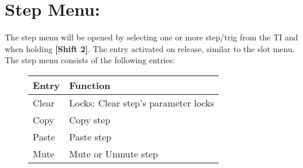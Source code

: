 \newpage
\section{Step Menu:}

The step menu will be opened by selecting one or more step/trig from the TI and when holding \textbf{[Shift 2]}. The entry activated on release, similar to the slot menu.
The step menu consists of the following entries:

\begin{figure}[hb]
    \begin{tabular}{|l|l|}
    \hline
    \rowcolor[HTML]{C0C0C0} 
    Entry            & Function \\ \hline
    Clear            & Locks: Clear step's parameter locks \\ \hline
    Copy         & Copy step\\ \hline
    Paste        & Paste step\\ \hline
    Mute         & Mute or Unmute step\\ \hline
    \end{tabular}
\end{figure}